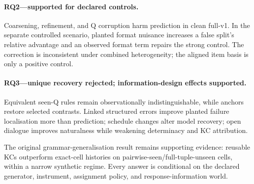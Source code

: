 \paragraph{RQ2---supported for declared controls.}
Coarsening, refinement, and Q corruption harm prediction in clean full-v1.  In
the separate controlled scenario, planted format nuisance increases a false
split's relative advantage and an observed format term repairs the strong
control.  The correction is inconsistent under combined heterogeneity; the
aligned item basis is only a positive control.

\paragraph{RQ3---unique recovery rejected; information-design effects
supported.}
Equivalent seen-Q rules remain observationally indistinguishable, while
anchors restore selected contrasts.  Linked structured errors improve planted
failure localisation more than prediction; schedule changes alter model
recovery; open dialogue improves naturalness while weakening determinacy and
KC attribution.

The original grammar-generalisation result remains supporting evidence:
reusable KCs outperform exact-cell histories on pairwise-seen/full-tuple-unseen
cells, within a narrow synthetic regime.  Every answer is conditional on the
declared generator, instrument, assignment policy, and response-information
world.
